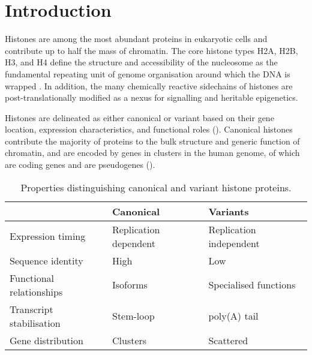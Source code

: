 \section{Introduction}

  Histones are among the most abundant proteins in eukaryotic cells
  and contribute up to half the mass of chromatin\addref{}.
  The core histone types H2A, H2B, H3, and H4
  define the structure and accessibility of the nucleosome
  as the fundamental repeating unit of genome organisation
  around which the DNA is wrapped \citep{Luger1997structure}.
  In addition, the many chemically reactive sidechains of histones
  are post-translationally modified
  as a nexus for signalling and heritable epigenetics.

  Histones are delineated as either canonical or variant based on
  their gene location, expression characteristics,
  and functional roles ().
  Canonical histones contribute the majority of proteins to
  the bulk structure and generic function of chromatin,
  and are encoded by \TotalCoreGenes{} genes in \NumberOfClusters{}
  clusters in the human genome,
  of which \TotalCoreCodingGenes{} are coding genes and \TotalCorePseudoGenes{}
  are pseudogenes ().

  \begin{table}
    \caption{Properties distinguishing canonical and variant histone proteins.}
    \label{tab:typical-histone-differences}
    \centering
    \begin{tabular}{l l l}
      \toprule
      \null                     & Canonical             & Variants \\
      \midrule
      Expression timing         & Replication dependent & Replication independent \\
      Sequence identity         & High                  & Low \\
      Functional relationships  & Isoforms              & Specialised functions \\
      Transcript stabilisation  & Stem-loop             & poly(A) tail \\
      Gene distribution         & Clusters              & Scattered \\
      \bottomrule
    \end{tabular}
  \end{table}


